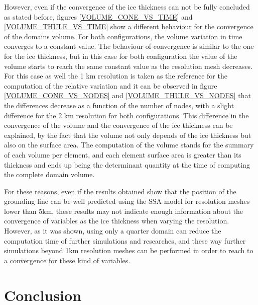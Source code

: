 \documentclass{article}
\begin{document}
However, even if the convergence of the ice thickness can not be fully concluded as stated before, figures \ref{VOLUME_CONE_VS_TIME} and \ref{VOLUME_THULE_VS_TIME} show a different behaviour for the convergence of the domains volume. For both configurations, the volume variation in time converges to a constant value. The behaviour of convergence is similar to the one for the ice thickness, but in this case for both configuration the value of the volume starts to reach the same constant value as the resolution mesh decreases. For this case as well the 1 km resolution is taken as the reference for the computation of the relative variation and it can be observed in figure \ref{VOLUME_CONE_VS_NODES} and \ref{VOLUME_THULE_VS_NODES} that the differences decrease as a function of the number of nodes, with a slight difference for the 2 km resolution for both configurations. This difference in the convergence of the volume and the convergence of the ice thickness can be explained, by the fact that the volume not only depends of the ice thickness but also on the surface area. The computation of the volume stands for the summary of each volume per element, and each element surface area is greater than its thickness and ends up being the determinant quantity at the time of computing the complete domain volume. 

For these reasons, even if the results obtained show that the position of the grounding line can be well predicted using the SSA model for resolution meshes lower than 5km, these results may not indicate enough information about the convergence of variables as the ice thickness when varying the resolution. However, as it was shown, using only a quarter domain can reduce the computation time of further simulations and researches, and these way further simulations beyond 1km resolution meshes can be performed in order to reach to a convergence for these kind of variables.  

\section{Conclusion}
\end{document}
